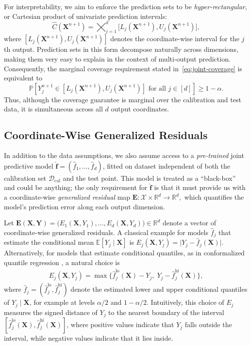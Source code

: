 For interpretability, we aim to enforce the prediction sets to be \emph{hyper-rectangular}, or Cartesian product of univariate prediction  intervals:
\begin{equation} \label{eq:rectangle}
\hat{C}(\mathbf{X}^{n+1}) 
= \bigtimes_{j=1}^d 
\bigl[ L_j(\mathbf{X}^{n+1}), 
       U_j(\mathbf{X}^{n+1}) \bigr],
     \end{equation}
where $[L_j(\mathbf{X}^{n+1}), U_j(\mathbf{X}^{n+1})]$ denotes the coordinate-wise interval for the $j$th output.  
Prediction sets in this form decompose naturally across dimensions, making them very easy to explain in the context of multi-output prediction.  
{\color{blue}Consequently, the marginal coverage
requirement stated in~\eqref{eq:joint-coverage} is equivalent to
\[
\mathbb P\left[
    {Y}_j^{n+1}\in
    [L_j(\mathbf{X}^{n+1}),U_j(\mathbf{X}^{n+1})]
    \text{ for all }j\in[d]
\right]
\geq 1-\alpha.
\]
Thus, although the coverage guarantee is marginal over the calibration and test
data, it is simultaneous across all $d$ output coordinates.
}


\subsection{Coordinate-Wise Generalized Residuals} \label{sec:residuals}

In addition to the data assumptions, we also assume access to a \emph{pre-trained} joint predictive model $\hat{\mathbf f} = (\hat{f}_1,\ldots,\hat{f}_d)$, fitted on dataset independent of both the calibration set $\mathcal{D}_{\mathrm{cal}}$ and the test point. 
This model is treated as a ``black-box'' and could be anything; the only requirement for $\hat{\mathbf f}$ is that it must provide us with a coordinate-wise \emph{generalized residual} map $\mathbf E : \mathcal{X} \times \mathbb{R}^d \to \mathbb{R}^d,$
which quantifies the model's prediction error along each output dimension.

Let
$\mathbf E(\mathbf X,\mathbf Y)
=
\bigl(
E_1(\mathbf X,Y_1),\ldots,E_d(\mathbf X,Y_d)
\bigr)
\in\mathbb R^d$
denote a vector of coordinate-wise generalized residuals.
A classical example for models $\hat{f}_j$ that estimate the conditional mean $\mathbb{E}[Y_j\mid\mathbf X]$ \citep{lei2018distribution} is $E_j(\mathbf X,Y_j) = \lvert Y_j - \hat{f}_j(\mathbf X) \rvert$.
Alternatively, for models that estimate conditional quantiles, as in conformalized quantile regression \citep{romano2019conformalized}, a natural choice is
\begin{align*}
E_j(\mathbf X,Y_j) = \max \bigl\{\hat{f}_j^{\mathrm{lo}}(\mathbf X) - Y_j,\; Y_j - \hat{f}_j^{\mathrm{hi}}(\mathbf X)\bigr\},
\end{align*}
where $\hat{f}_j = (\hat{f}_j^{\mathrm{lo}}, \hat{f}_j^{\mathrm{hi}})$ denote the estimated lower and upper conditional quantiles of $Y_j\mid \mathbf X$, for example at levels $\alpha/2$ and $1-\alpha/2$. Intuitively, this choice of $E_j$ measures the signed distance of $Y_j$ to the nearest boundary of the  interval $[\hat{f}_j^{\mathrm{lo}}(\mathbf X), \hat{f}_j^{\mathrm{hi}}(\mathbf X)]$, where
positive values indicate that $Y_j$ falls outside the interval, while negative values indicate that it lies inside.

